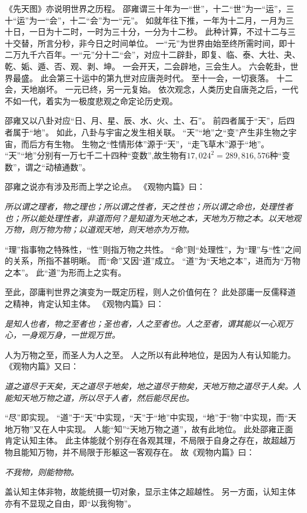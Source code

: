 \documentclass[11pt]{article}
\begin{document}
\par

《先天图》亦说明世界之历程。
邵雍谓三十年为一“世”，十二“世”为一“运”，三十“运”为一“会”，十二“会”为一“元”。
如就年往下推，一年为十二月，一月为三十日，一日为十二时，一时为三十分，一分为十二秒。
此种计算，不过十二与三十交替，所言分秒，非今日之时间单位。
一“元”为世界由始至终所需时间，即十二万九千六百年。一“元”分十二“会”，对应十二辟卦，即复、临、泰、大壮、夬、乾、姤、遁、否、观、剥、坤。
一会开天，二会辟地，三会生人。
六会乾卦，世界最盛。
此会第三十运中的第九世对应唐尧时代。
至十一会，一切衰落。
十二会，天地崩坏。
一元已终，另一元复始。
依次观念，人类历史自唐尧之后，一代不如一代，着实为一极度悲观之命定论历史观。

\par

邵雍又以八卦对应“日、月、星、辰、水、火、土、石”。
前四者属于“天”，后四者属于“地”。
如此，八卦与宇宙之发生相关联。
“天”“地”之“变”产生非生物之宇宙，而后方有生物。
生物之“性情形体”源于“天”，“走飞草木”源于“地”。
“天”“地”分别有一万七千二十四种“变数”,故生物有$17,024^2=289,816,576$种“变数”，谓之“动植通数”。

\par

邵雍之说亦有涉及形而上学之论点。
《观物内篇》曰：

\textit{所以谓之理者，物之理也；所以谓之性者，天之性也；所以谓之命也，处理性者也；所以能处理性者，非道而何？是知道为天地之本，天地为万物之本。以天地观万物，则万物为物；以道观天地，则天地亦为万物。}

“理”指事物之特殊性，“性”则指万物之共性。
“命”则“处理性”，为“理”与“性”之间的关系，所指不甚明晰。
而“命”又因“道”成立。
“道”为“天地之本”，进而为“万物之本”。
此“道”为形而上之实有。

\par

至此，邵庸判世界之演变为一既定历程，则人之价值何在？
此处邵庸一反儒释道之精神，肯定认知主体。
《观物内篇》曰：

\textit{是知人也者，物之至者也；圣也者，人之至者也。人之至者，谓其能以一心观万心，一身观万身，一世观万世。}

人为万物之至，而圣人为人之至。
人之所以有此种地位，是因为人有认知能力。
《观物内篇》又曰：

\textit{道之道尽于天矣，天之道尽于地矣，地之道尽于物矣，天地万物之道尽于人矣。人能知天地万物之道，所以尽于人者，然后能尽民也。}

“尽”即实现。
“道”于“天”中实现，“天”于“地”中实现，“地”于“物”中实现，而“天地万物”又在人中实现。
人能“知”“天地万物之道”，故有此地位。
此处邵雍正面肯定认知主体。
此主体能就个别存在各观其理，不局限于自身之存在，故超越万物且能知万物，并不局限于形躯这一客观存在。
故《观物内篇》曰：

\textit{不我物，则能物物。}

盖认知主体非物，故能统摄一切对象，显示主体之超越性。
另一方面，认知主体亦有不显现之自由，即“以我徇物”。
\end{document}
